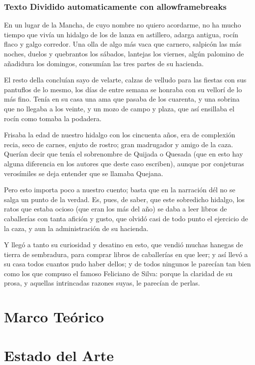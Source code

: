 \documentclass[aspectratio=169]{beamer}%
\begin{document}
\begin{frame}
	\frametitle{Texto Dividido automaticamente con allowframebreaks}
	\justifying
En un lugar de la Mancha, de cuyo nombre no quiero acordarme, no ha mucho tiempo que vivía un hidalgo de los de lanza en astillero, adarga antigua, rocín flaco y galgo corredor. Una olla de algo más vaca que carnero, salpicón las más noches, duelos y quebrantos los sábados, lantejas los viernes, algún palomino de añadidura los domingos, consumían las tres partes de su hacienda.

El resto della concluían sayo de velarte, calzas de velludo para las fiestas con sus pantuflos de lo mesmo, los días de entre semana se honraba con su vellorí de lo más fino. Tenía en su casa una ama que pasaba de los cuarenta, y una sobrina que no llegaba a los veinte, y un mozo de campo y plaza, que así ensillaba el rocín como tomaba la podadera.

Frisaba la edad de nuestro hidalgo con los cincuenta años, era de complexión recia, seco de carnes, enjuto de rostro; gran madrugador y amigo de la caza. Querían decir que tenía el sobrenombre de Quijada o Quesada (que en esto hay alguna diferencia en los autores que deste caso escriben), aunque por conjeturas verosímiles se deja entender que se llamaba Quejana.

Pero esto importa poco a nuestro cuento; basta que en la narración dél no se salga un punto de la verdad. Es, pues, de saber, que este sobredicho hidalgo, los ratos que estaba ocioso (que eran los más del año) se daba a leer libros de caballerías con tanta afición y gusto, que olvidó casi de todo punto el ejercicio de la caza, y aun la administración de su hacienda.

Y llegó a tanto su curiosidad y desatino en esto, que vendió muchas hanegas de tierra de sembradura, para comprar libros de caballerías en que leer; y así llevó a su casa todos cuantos pudo haber dellos; y de todos ningunos le parecían tan bien como los que compuso el famoso Feliciano de Silva: porque la claridad de su prosa, y aquellas intrincadas razones suyas, le parecían de perlas.

\end{frame}

\section{Marco Teórico}
\section{Estado del Arte}
\end{document}

